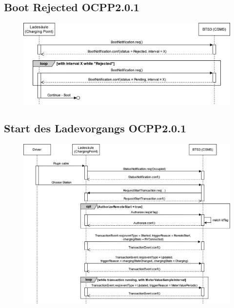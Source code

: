 \subsection{Boot Rejected OCPP2.0.1}
\begin{figure} [H]
	\centering
	\includegraphics[width=1.0\textwidth]{images/OCPP/Boot_Rejected_OCPP201.drawio.png}
\end{figure}
\newpage
\subsection{Start des Ladevorgangs OCPP2.0.1}
\begin{figure} [H]
	\centering
	\includegraphics[width=1.0\textwidth]{images/OCPP/Start_transaktion_ocpp201.drawio.png}
\end{figure}

\newpage
